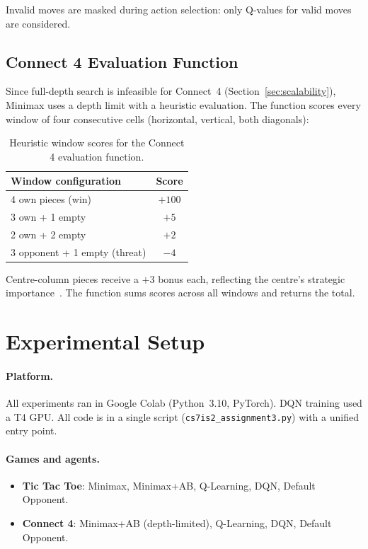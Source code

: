 \documentclass[12pt, a4paper]{article}
\begin{document}
Invalid moves are masked during action selection: only Q-values for valid moves are considered.


\subsection{Connect 4 Evaluation Function}
\label{sec:eval_fn}

Since full-depth search is infeasible for Connect~4 (Section~\ref{sec:scalability}), Minimax
uses a depth limit with a heuristic evaluation. The function scores every window of four
consecutive cells (horizontal, vertical, both diagonals):

\begin{table}[H]
\centering
\caption{Heuristic window scores for the Connect 4 evaluation function.}
\label{tab:eval_scores}
\small
\begin{tabular}{lc}
\toprule
\textbf{Window configuration} & \textbf{Score} \\
\midrule
4 own pieces (win)                   & $+100$ \\
3 own + 1 empty                      & $+5$ \\
2 own + 2 empty                      & $+2$ \\
3 opponent + 1 empty (threat)        & $-4$ \\
\bottomrule
\end{tabular}
\end{table}

Centre-column pieces receive a $+3$ bonus each, reflecting the centre's strategic
importance~\cite{allis1988}. The function sums scores across all windows and returns the total.


\section{Experimental Setup}

\paragraph{Platform.}
All experiments ran in Google Colab (Python~3.10, PyTorch). DQN training used a T4 GPU. All
code is in a single script (\texttt{cs7is2\_assignment3.py}) with a unified entry point.

\paragraph{Games and agents.}
\begin{itemize}
    \item \textbf{Tic Tac Toe}: Minimax, Minimax+AB, Q-Learning, DQN, Default Opponent.
    \item \textbf{Connect 4}: Minimax+AB (depth-limited), Q-Learning, DQN, Default Opponent.
\end{itemize}
\end{document}
